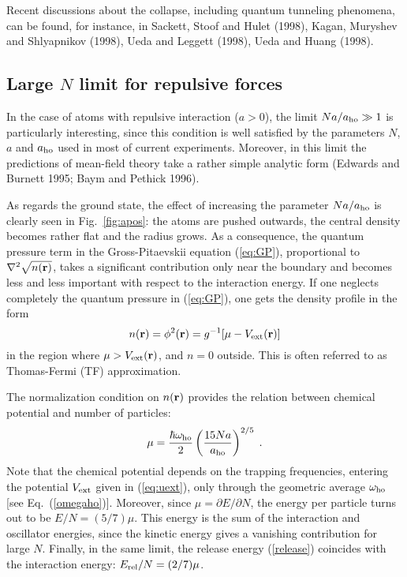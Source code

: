 Recent discussions about the collapse, including quantum tunneling
phenomena, can be found, for instance, in Sackett, Stoof and Hulet (1998), 
Kagan, Muryshev and Shlyapnikov (1998), Ueda and Leggett (1998), Ueda and 
Huang (1998). 

\subsection{\bf Large $N$ limit for repulsive forces}
\label{sec:TF}

In the case of atoms with repulsive interaction ($a>0$), the limit
$Na/a_{\rm ho} \gg 1$ is particularly interesting, since this condition
is well satisfied by the parameters $N$, $a$ and $a_{\rm ho}$ used in
most of current experiments. Moreover, in this limit the
predictions of mean-field theory take a rather simple analytic
form (Edwards and Burnett 1995; Baym and Pethick 1996).

As regards the ground state, the effect of increasing the parameter
$Na/a_{\rm ho}$ is clearly seen in Fig.~\ref{fig:apos}: the
atoms are pushed outwards, the central density becomes rather flat
and the radius grows. As a consequence, the quantum
pressure term in the Gross-Pitaevskii equation (\ref{eq:GP}),
proportional to $\nabla^2 \sqrt{n({\bf r})}$, takes a significant
contribution only near the boundary and becomes less and less
important with respect to  the interaction energy. If one neglects
completely the quantum pressure in (\ref{eq:GP}), one gets the
density profile in the form
\begin{equation}
n({\bf r}) = \phi^2({\bf r}) = g^{-1} [ \mu - V_{\rm ext}({\bf r})]
\label{eq:rhoTF}
\end{equation}
in the region where $\mu > V_{\rm ext}({\bf r})$, and $n=0$ outside.
This is often referred to as Thomas-Fermi (TF) approximation.

The normalization condition on $n({\bf r})$ provides the relation
between chemical potential and number of particles:
\begin{equation}
\mu =   {\hbar \omega_{\rm ho} \over 2}
\left( { 15 N a \over a_{\rm ho} } \right)^{2/5} \; .
\label{eq:muTF}
\end{equation}
Note that the chemical potential depends on the trapping frequencies,
entering the potential $V_{\rm ext}$ given in (\ref{eq:uext}), only
through the geometric average $\omega_{\rm ho}$ [see Eq.~(\ref{omegaho})]. 
Moreover,  since $\mu = \partial E/ \partial N$, the energy 
per particle turns out to be
$E/N = (5/7) \mu$. This energy is the sum of the interaction
and oscillator energies, since the kinetic energy gives a vanishing
contribution for large $N$.  Finally, in the same limit, the release 
energy (\ref{release}) coincides with the interaction energy: 
$E_{\rm rel}/N =(2/7)\mu$.

